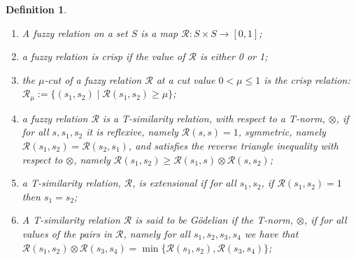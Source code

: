 \documentclass{article}
\newcommand{\cR}{{\mathcal R}}
\def\cut{\mu}
\newtheorem{definition}{Definition}[section]
\begin{document}
\begin{definition}\hfill \begin{enumerate}
\item A {\em fuzzy relation} on a
set $S$ is a map $\cR:S\times S\to[0,1]$;
\item a fuzzy relation is {\em crisp} if the value of $\cR$ is either 0 or 1;
\item the \emph{$\cut$-cut} of a fuzzy relation $\cR$ at a \emph{cut value}
$0<\cut\le 1$ is the crisp relation:
$\cR_\cut := \{(s_1,s_2) \mid \cR(s_1,s_2) \ge \cut \}$;
\item a fuzzy relation $\cR$ is a \emph{T-similarity relation}, with respect to a T-norm, $\otimes$, if for all $s,s_1,s_2$ it is {\em reflexive}, namely $\cR(s,s)=1$, {\em symmetric}, namely $\cR(s_1,s_2)=\cR(s_2,s_1)$, and satisfies the {\em reverse
triangle inequality} with respect to $\otimes$, namely $\cR(s_1,s_2)\ge \cR(s_1,s) \otimes \cR(s,s_2)$;
\item a T-similarity relation, $\cR$, is {\em extensional} if for all $s_1,s_2$, if $\cR(s_1,s_2)=1$ then $s_1=s_2$;
\item A T-similarity relation $\cR$ is said to be {\em G\"odelian} if the T-norm, $\otimes$, if for all  values of the pairs in $\cR$, namely for all $s_1,s_2,s_3,s_4$ we have that $ \cR(s_1,s_2) \otimes \cR(s_3,s_4)=\min\{\cR(s_1,s_2), \cR(s_3,s_4)\}$;
\end{enumerate}
\end{definition} 
\end{document}
